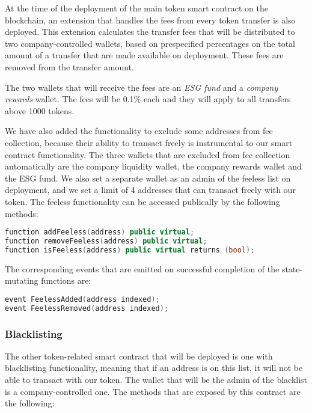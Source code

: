 \documentclass[a4paper,12pt]{article}
\begin{document}
At the time of the deployment of the main token smart contract on the blockchain,
an extension that handles the fees from every token transfer is also deployed.
This extension calculates the transfer fees that will be distributed to two company-controlled wallets, based on prespecified percentages on the total amount of a transfer that are made available on deployment. These fees are removed from the transfer amount.

The two wallets that will receive the fees are an \textit{ESG fund} and a \textit{company rewards} wallet. The fees will be 0.1\% each and they will apply to all transfers above 1000 tokens.

We have also added the functionality to exclude some addresses from fee collection, because their ability to transact freely is instrumental to our smart contract functionality.
The three wallets that are excluded from fee collection automatically are the company liquidity wallet, the company rewards wallet and the ESG fund. We also set a separate wallet as an admin of the feeless list on deployment, and we set a limit of 4 addresses that can transact freely with our token.
The feeless functionality can be accessed publically by the following methods:

\begin{lstlisting}[language=C++, caption=Solidity feeless functions.]
function addFeeless(address) public virtual;
function removeFeeless(address) public virtual;
function isFeeless(address) public virtual returns (bool);
\end{lstlisting}
The corresponding events that are emitted on successful completion of the state-mutating functions are:
\begin{lstlisting}[language=C++, caption=Solidity feeless events.]
event FeelessAdded(address indexed);
event FeelessRemoved(address indexed);
\end{lstlisting}

\subsubsection{Blacklisting}

The other token-related smart contract that will be deployed is one with blacklisting functionality, meaning that if an address is on this list, it will not be able to transact with our token. The wallet that will be the admin of the blacklist is a company-controlled one.
The methods that are exposed by this contract are the following:
\end{document}
